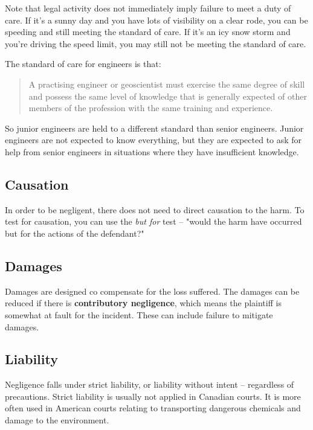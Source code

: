 \documentclass{article}
\begin{document}
Note that legal activity does not immediately imply failure to meet a duty of care. If it's a sunny day and you have lots of visibility on a clear rode, you can be speeding and still meeting the standard of care. If it's an icy snow storm and you're driving the speed limit, you may still not be meeting the standard of care.

The standard of care for engineers is that:

\begin{quote}
A practising engineer or
geoscientist must exercise the same degree of
skill and possess the same level of knowledge
that is generally expected of other members of
the profession with the same training and
experience.
\end{quote}

So junior engineers are held to a different standard than senior engineers. Junior engineers are not expected to know everything, but they are expected to ask for help from senior engineers in situations where they have insufficient knowledge.

\subsection{Causation}

In order to be negligent, there does not need to direct causation to the harm. To test for causation, you can use the \textit{but for} test -- "would the harm have occurred but for the actions of the defendant?"

\subsection{Damages}

Damages are designed co compensate for the loss suffered. The damages can be reduced if there is \textbf{contributory negligence}, which means the plaintiff is somewhat at fault for the incident. These can include failure to mitigate damages.

\subsection{Liability}

Negligence falls under strict liability, or liability without intent -- regardless of precautions. Strict liability is usually not applied in Canadian courts. It is more often used in American courts relating to transporting dangerous chemicals and damage to the environment.
\end{document}
